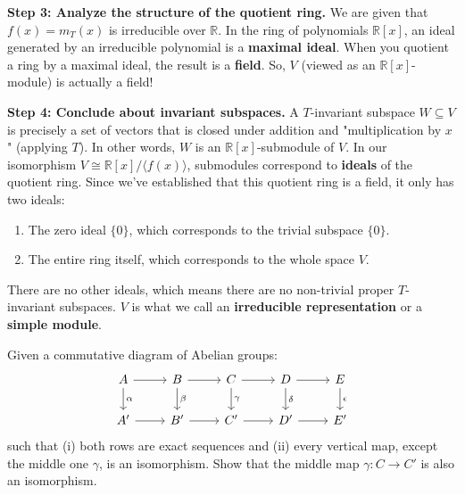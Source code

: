 \begin{solution}
\textbf{Step 3: Analyze the structure of the quotient ring.}
We are given that $f(x) = m_T(x)$ is irreducible over $\mathbb{R}$. 
In the ring of polynomials $\mathbb{R}[x]$, an ideal generated by an irreducible polynomial is a \textbf{maximal ideal}.
When you quotient a ring by a maximal ideal, the result is a \textbf{field}.
So, $V$ (viewed as an $\mathbb{R}[x]$-module) is actually a field!

\textbf{Step 4: Conclude about invariant subspaces.}
A $T$-invariant subspace $W \subseteq V$ is precisely a set of vectors that is closed under addition and "multiplication by $x$" (applying $T$). In other words, $W$ is an $\mathbb{R}[x]$-submodule of $V$.
In our isomorphism $V \cong \mathbb{R}[x] / \langle f(x) \rangle$, submodules correspond to \textbf{ideals} of the quotient ring.
Since we've established that this quotient ring is a field, it only has two ideals:
\begin{enumerate}
    \item The zero ideal $\{0\}$, which corresponds to the trivial subspace $\{0\}$.
    \item The entire ring itself, which corresponds to the whole space $V$.
\end{enumerate}
There are no other ideals, which means there are no non-trivial proper $T$-invariant subspaces. $V$ is what we call an \textbf{irreducible representation} or a \textbf{simple module}.
\end{solution}

\begin{exercise}
\label{algebra:2011:5}
Given a commutative diagram of Abelian groups:
\[ \begin{tikzcd}
A \arrow[r] \arrow[d, "\alpha"] & B \arrow[r] \arrow[d, "\beta"] & C \arrow[r] \arrow[d, "\gamma"] & D \arrow[r] \arrow[d, "\delta"] & E \arrow[d, "\epsilon"] \\
A' \arrow[r] & B' \arrow[r] & C' \arrow[r] & D' \arrow[r] & E'
\end{tikzcd} \]
such that (i) both rows are exact sequences and (ii) every vertical map, except the middle one $\gamma$, is an isomorphism. Show that the middle map $\gamma: C \to C'$ is also an isomorphism.
\end{exercise}

